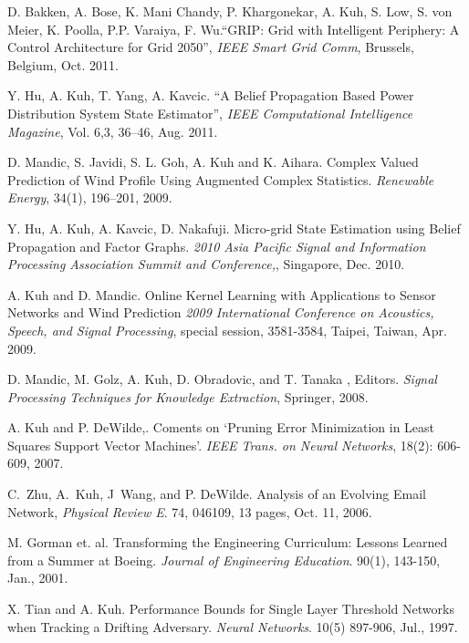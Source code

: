 \begin{Publications: Closely Related}

\item  D. Bakken, A. Bose, K. Mani Chandy, P. Khargonekar, A. Kuh, S. Low, S. von Meier, 
K. Poolla, P.P. Varaiya, F. Wu.``GRIP: Grid with Intelligent Periphery: A Control Architecture
for Grid 2050'',  {\it IEEE Smart Grid Comm}, Brussels, Belgium,  Oct. 2011.
\item Y. Hu, A. Kuh, T. Yang, A. Kavcic.
``A Belief Propagation Based Power Distribution System State Estimator'', {\it IEEE Computational Intelligence Magazine}, Vol. 6,3, 36--46,  Aug. 2011.
\item
\newblock D. Mandic, S. Javidi, S. L. Goh, A. Kuh and K. Aihara.
\newblock Complex Valued Prediction of Wind Profile Using Augmented
Complex Statistics.
\newblock \emph{Renewable Energy}, 34(1), 196--201, 2009.
\item
\newblock Y. Hu, A. Kuh, A. Kavcic, D. Nakafuji.
\newblock Micro-grid State Estimation using Belief Propagation and Factor Graphs.
\newblock \emph{2010 Asia Pacific Signal and Information Processing Association Summit and Conference,}, Singapore, Dec. 2010.
\item
\newblock A. Kuh and D. Mandic.
\newblock Online Kernel Learning with Applications to Sensor Networks and Wind Prediction
\newblock \emph{2009 International Conference on 
Acoustics, Speech, and Signal Processing}, special session,  3581-3584, Taipei, Taiwan, Apr. 2009.

\end{Publications: Closely Related}


\begin{Publications: Other Significant}
\item
\newblock D.  Mandic, M. Golz, A. Kuh, D. Obradovic, and T. Tanaka , Editors.
\newblock \emph{Signal Processing Techniques for Knowledge Extraction}, Springer, 2008.
\item
\newblock A. Kuh and P. DeWilde,.
\newblock Coments on `Pruning Error Minimization in Least Squares Support Vector Machines'.
\newblock
\emph{IEEE Trans. on Neural Networks}, 18(2): 606-609,  2007.
\item
C.~Zhu, A.~Kuh, J~Wang, and P. DeWilde.
\newblock Analysis of an Evolving Email Network,
\newblock\emph{Physical Review E}. 74, 046109, 13 pages, Oct. 11, 2006.
\item
\newblock M. Gorman et. al.
\newblock Transforming the Engineering Curriculum: Lessons Learned from a Summer at Boeing.
\newblock\emph{Journal of Engineering Education}. 90(1), 143-150, Jan., 2001.
\item
\newblock X. Tian and A. Kuh.
\newblock Performance Bounds for Single Layer Threshold Networks when Tracking a Drifting Adversary.
\newblock \emph{Neural Networks}. 10(5) 897-906, Jul., 1997.
\end{Publications: Other Significant}


